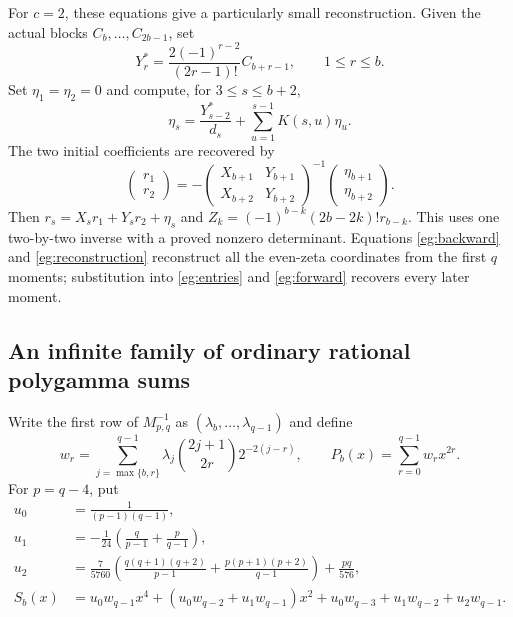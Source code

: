 \documentclass[11pt]{article}
\theoremstyle{definition}
\theoremstyle{remark}
\numberwithin{equation}{section}
\begin{document}
For $c=2$, these equations give a particularly small reconstruction.
Given the actual blocks $C_b,\ldots,C_{2b-1}$, set
\[
 Y_r^*=\frac{2(-1)^{r-2}}{(2r-1)!}C_{b+r-1},\qquad1\le r\le b.
\]
Set $\eta_1=\eta_2=0$ and compute, for $3\le s\le b+2$,
\begin{equation}\label{eg:inhomogeneous}
 \eta_s=\frac{Y_{s-2}^*}{d_s}
          +\sum_{u=1}^{s-1}K(s,u)\eta_u.
\end{equation}
The two initial coefficients are recovered by
\begin{equation}\label{eg:reconstruction}
 \begin{pmatrix}r_1\\r_2\end{pmatrix}
 =-\begin{pmatrix}X_{b+1}&Y_{b+1}\\X_{b+2}&Y_{b+2}\end{pmatrix}^{-1}
       \begin{pmatrix}\eta_{b+1}\\\eta_{b+2}\end{pmatrix}.
\end{equation}
Then $r_s=X_sr_1+Y_sr_2+\eta_s$ and
$Z_k=(-1)^{b-k}(2b-2k)!r_{b-k}$. This uses one two-by-two inverse
with a proved nonzero determinant. Equations \eqref{eg:backward} and
\eqref{eg:reconstruction} reconstruct all the even-zeta coordinates
from the first $q$ moments; substitution into \eqref{eg:entries} and
\eqref{eg:forward} recovers every later moment.

\subsection{An infinite family of ordinary rational polygamma sums}

Write the first row of $M_{p,q}^{-1}$ as
$(\lambda_b,\ldots,\lambda_{q-1})$ and define
\begin{equation}\label{eg:ordinary-weights}
 w_r=\sum_{j=\max\{b,r\}}^{q-1}
          \lambda_j\binom{2j+1}{2r}2^{-2(j-r)},\qquad
 P_b(x)=\sum_{r=0}^{q-1}w_rx^{2r}.
\end{equation}
For $p=q-4$, put
\begin{align*}
 u_0&=\frac1{(p-1)(q-1)},\\
 u_1&=-\frac1{24}\left(\frac q{p-1}+\frac p{q-1}\right),\\
 u_2&=\frac7{5760}\left(
 \frac{q(q+1)(q+2)}{p-1}+\frac{p(p+1)(p+2)}{q-1}\right)
          +\frac{pq}{576},\\
 S_b(x)&=u_0w_{q-1}x^4
       +(u_0w_{q-2}+u_1w_{q-1})x^2
       +u_0w_{q-3}+u_1w_{q-2}+u_2w_{q-1}.
\end{align*}
\end{document}
